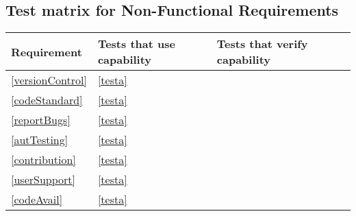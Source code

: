 \subsection{Test matrix for Non-Functional Requirements}
\begin{tabular}{|l|l|l|l|}
	\hline
	Requirement & Tests that use capability & Tests that verify capability \\
	\hline
	\hline
		\ref{versionControl} & \ref{testa} \\
	\hline
		\ref{codeStandard} & \ref{testa} \\
	\hline
		\ref{reportBugs} & \ref{testa} \\
	\hline
		\ref{autTesting} & \ref{testa} \\
	\hline
		\ref{contribution} & \ref{testa} \\
	\hline
		\ref{userSupport} & \ref{testa} \\
	\hline
		\ref{codeAvail} & \ref{testa} \\
	\hline
\end{tabular}

	
